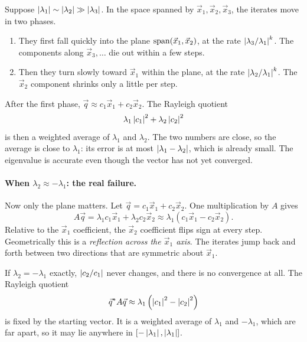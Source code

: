 Suppose $\left\lvert \lambda_1 \right\rvert \sim \left\lvert \lambda_2 \right\rvert \gg \left\lvert \lambda_3 \right\rvert$. In the space spanned by $\vec{x}_1, \vec{x}_2, \vec{x}_3$, the iterates move in two phases.
\begin{enumerate}
  \item They first fall quickly into the plane $\operatorname{span}(\vec{x}_1, \vec{x}_2)$, at the rate $\left\lvert \lambda_3/\lambda_1 \right\rvert^k$. The components along $\vec{x}_3, \dots$ die out within a few steps.
  \item Then they turn slowly toward $\vec{x}_1$ within the plane, at the rate $\left\lvert \lambda_2/\lambda_1 \right\rvert^k$. The $\vec{x}_2$ component shrinks only a little per step.
\end{enumerate}
After the first phase, $\vec{q} \approx c_1\vec{x}_1 + c_2\vec{x}_2$. The Rayleigh quotient
\begin{equation*}
  \lambda_1\left\lvert c_1 \right\rvert^2 + \lambda_2\left\lvert c_2 \right\rvert^2
\end{equation*}
is then a weighted average of $\lambda_1$ and $\lambda_2$. The two numbers are close, so the average is close to $\lambda_1$: its error is at most $\left\lvert \lambda_1 - \lambda_2 \right\rvert$, which is already small. The eigenvalue is accurate even though the vector has not yet converged.

\paragraph{When \texorpdfstring{$\lambda_2 \approx -\lambda_1$}{λ2 ≈ −λ1}: the real failure.} Now only the plane matters. Let $\vec{q} = c_1\vec{x}_1 + c_2\vec{x}_2$. One multiplication by $A$ gives
\begin{equation*}
  A\vec{q} = \lambda_1c_1\vec{x}_1 + \lambda_2c_2\vec{x}_2 \approx \lambda_1(c_1\vec{x}_1 - c_2\vec{x}_2).
\end{equation*}
Relative to the $\vec{x}_1$ coefficient, the $\vec{x}_2$ coefficient flips sign at every step. Geometrically this is a \emph{reflection across the $\vec{x}_1$ axis}. The iterates jump back and forth between two directions that are symmetric about $\vec{x}_1$.

If $\lambda_2 = -\lambda_1$ exactly, $\left\lvert c_2/c_1 \right\rvert$ never changes, and there is no convergence at all. The Rayleigh quotient
\begin{equation}
  \vec{q}^\ast A\vec{q} \approx \lambda_1\left(\left\lvert c_1 \right\rvert^2 - \left\lvert c_2 \right\rvert^2\right)
\end{equation}
is fixed by the starting vector. It is a weighted average of $\lambda_1$ and $-\lambda_1$, which are far apart, so it may lie anywhere in $[-\left\lvert \lambda_1 \right\rvert, \left\lvert \lambda_1 \right\rvert]$.

